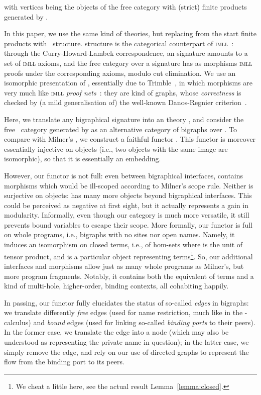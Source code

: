 \documentclass{llncs}
\newcommand{\imll}{\textsc{imll}}
\begin{document}
with vertices being the objects of the free category with (strict)
finite products generated by .

In this paper, we use the same kind of theories, but replacing from
the start finite products with \smc\ structure.  \smc{} structure is
the categorical counterpart of \imll{}~\cite{ll,Trimble:phd}: through
the Curry-Howard-Lambek correspondence, an \smc{} signature amounts to
a set of \imll{} axioms, and the free \smc{} category 
over a signature  has as morphisms \imll{} proofs under the
corresponding axioms, modulo cut elimination.  We use an isomorphic
presentation of , essentially due to
Trimble~\cite{Trimble:phd}, in which morphisms are very much like
\imll{} \emph{proof nets}~\cite{ll}: they are kind of graphs, whose
\emph{correctness} is checked by (a mild generalisation of) the
well-known Danos-Regnier criterion~\cite{Danos:mll}.

Here, we translate any bigraphical signature  into an \smc{}
theory , and consider the free \smc\ category  generated by  as an alternative
category of bigraphs over .  To compare 
with Milner's , we construct a faithful functor . This functor is moreover
essentially injective on objects (i.e., two objects with the same
image are isomorphic), so that it is essentially an embedding.

However, our functor  is not full: even between bigraphical
interfaces,  contains morphisms which would be
ill-scoped according to Milner's scope rule. Neither is 
surjective on objects:  has many more objects
beyond bigraphical interfaces. This could be perceived as negative at
first sight, but it actually represents a gain in
modularity. Informally, even though our category is much more
versatile, it still prevents bound variables to escape their
scope. More formally, our functor is full on whole programs, i.e.,
bigraphs with no sites nor open names. Namely, it induces an
isomorphism on closed terms, i.e., of hom-sets  where  is the unit of tensor
product, and  is a particular object representing terms\footnote{We
  cheat a little here, see the actual result
  Lemma~\ref{lemma:closed}.}.  So, our additional interfaces and
morphisms allow just as many whole programs as Milner's, but more
program fragments. Notably, it contains both the equivalent of terms
and a kind of multi-hole, higher-order, binding contexts, all
cohabiting happily.

In passing, our functor fully elucidates the status of so-called
\emph{edges} in bigraphs: we translate differently \emph{free} edges
(used for name restriction, much like  in the -calculus) and
\emph{bound} edges (used for linking so-called \emph{binding ports} to
their peers). In the former case, we translate the edge into a 
node (which may also be understood as representing the private name in
question); in the latter case, we simply remove the edge, and rely on
our use of directed graphs to represent the flow from the binding port
to its peers.
\end{document}
